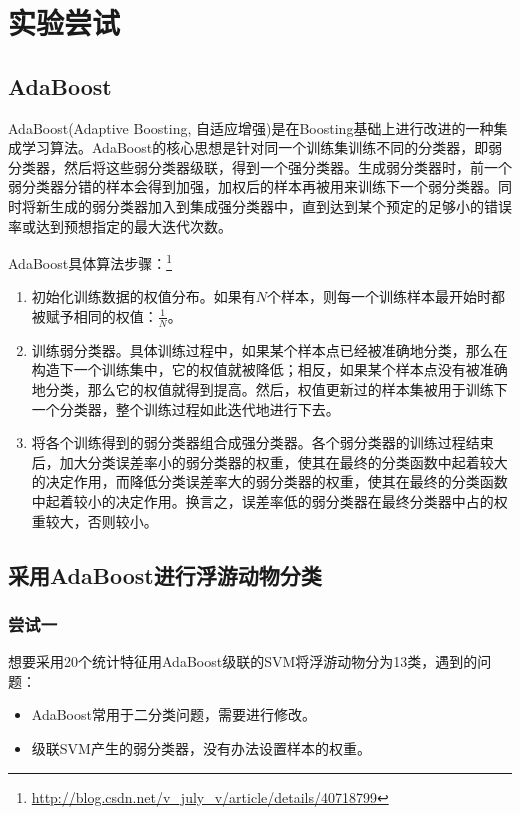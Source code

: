 \section{实验尝试}

\subsection{AdaBoost}
AdaBoost(Adaptive Boosting, 自适应增强)是在Boosting基础上进行改进的一种集成学习算法。AdaBoost的核心思想是针对同一个训练集训练不同的分类器，即弱分类器，然后将这些弱分类器级联，得到一个强分类器。生成弱分类器时，前一个弱分类器分错的样本会得到加强，加权后的样本再被用来训练下一个弱分类器。同时将新生成的弱分类器加入到集成强分类器中，直到达到某个预定的足够小的错误率或达到预想指定的最大迭代次数。

AdaBoost具体算法步骤：\footnote{\url{http://blog.csdn.net/v_july_v/article/details/40718799}}
\begin{enumerate}
\item 初始化训练数据的权值分布。如果有$N$个样本，则每一个训练样本最开始时都被赋予相同的权值：$\frac{1}{N}$。
\item 训练弱分类器。具体训练过程中，如果某个样本点已经被准确地分类，那么在构造下一个训练集中，它的权值就被降低；相反，如果某个样本点没有被准确地分类，那么它的权值就得到提高。然后，权值更新过的样本集被用于训练下一个分类器，整个训练过程如此迭代地进行下去。
\item 将各个训练得到的弱分类器组合成强分类器。各个弱分类器的训练过程结束后，加大分类误差率小的弱分类器的权重，使其在最终的分类函数中起着较大的决定作用，而降低分类误差率大的弱分类器的权重，使其在最终的分类函数中起着较小的决定作用。换言之，误差率低的弱分类器在最终分类器中占的权重较大，否则较小。
\end{enumerate}

\subsection{采用AdaBoost进行浮游动物分类}
\subsubsection{尝试一}
想要采用20个统计特征用AdaBoost级联的SVM将浮游动物分为13类，遇到的问题：
\begin{itemize}
\item AdaBoost常用于二分类问题，需要进行修改。
\item 级联SVM产生的弱分类器，没有办法设置样本的权重。
\end{itemize}

